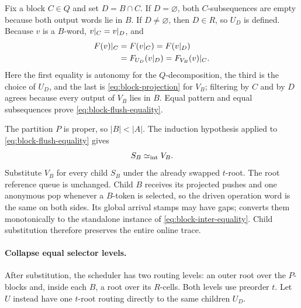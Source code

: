 Fix a block \(C\in Q\) and set \(D=B\cap C\).  If \(D=\varnothing\), both
\(C\)-subsequences are empty because both output words lie in \(B\).  If
\(D\ne\varnothing\), then \(D\in R\), so \(U_D\) is defined.  Because \(v\)
is a \(B\)-word, \(v\mathord{|}_{C}=v\mathord{|}_{D}\), and
\begin{equation}
\begin{aligned}
 F(v)\mathord{|}_{C}
 &=F(v\mathord{|}_{C})
  =F(v\mathord{|}_{D})\\
 &=F_{U_D}(v\mathord{|}_{D})
  =F_{V_B}(v)\mathord{|}_{C}.
\end{aligned}
\label{eq:block-subsequences}
\end{equation}
Here the first equality is autonomy for the \(Q\)-decomposition, the third is
the choice of \(U_D\), and the last is
\autoref{eq:block-projection} for \(V_B\); filtering by \(C\) and by \(D\) agrees
because every output of \(V_B\) lies in \(B\).  Equal pattern and equal
subsequences prove \autoref{eq:block-flush-equality}.

The partition \(P\) is proper, so \(|B|<|A|\).  The induction hypothesis
applied to \autoref{eq:block-flush-equality} gives
\begin{equation}
  S_B\mathrel{\simeq_{\mathrm{int}}} V_B.
  \label{eq:block-inter-equality}
\end{equation}
Substitute \(V_B\) for every child \(S_B\) under the already swapped
\(t\)-root.  The root reference queue is unchanged.  Child \(B\) receives its
projected pushes and one anonymous pop whenever a \(B\)-token is selected, so
the driven operation word is the same on both sides.  Its global arrival stamps
may have gaps;  converts them monotonically to the
standalone instance of \autoref{eq:block-inter-equality}.  Child substitution
therefore preserves the entire online trace.

\paragraph{Collapse equal selector levels.}
After substitution, the scheduler has two routing levels: an outer root over
the \(P\)-blocks and, inside each \(B\), a root over its \(R\)-cells.  Both
levels use preorder \(t\).  Let \(U\) instead have one \(t\)-root routing
directly to the same children \(U_D\).

